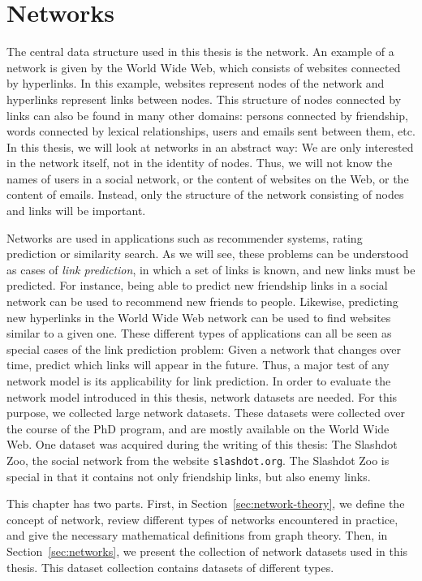 \documentclass[11pt,a4paper]{book}
\begin{document}
\chapter{Networks}
\label{chap:preliminaries}
The central data structure used in this thesis is the network.  An
example of a network is given by the World Wide Web, which consists of
websites connected by hyperlinks.  In this example, websites represent
nodes of the network and hyperlinks represent links between nodes.  This
structure of nodes connected by links can also be found in many other
domains:  persons connected by friendship, words connected by lexical
relationships, users and emails sent between them, etc.  In this thesis,
we will look at networks in an abstract way:  We are only interested in
the network itself, not in the identity of nodes.  Thus, we will not
know the names of users in a social network, or the content of websites
on the Web, or the content of emails.  Instead, only the structure of
the network consisting of nodes and links will be important.  


Networks are used in
applications such as recommender systems, rating prediction or
similarity search.  As we will see, these problems can be
understood as cases of \emph{link prediction}, in which a set of
links is known, and new links must be predicted.  For instance,
being able to predict new friendship links in a social network can be used
to recommend new friends to people.  Likewise, predicting new hyperlinks
in the World Wide Web network can be used to find websites similar to a
given one.  These different types of applications can all be seen as
special cases of the link prediction problem:  Given a network that
changes over time, predict which links will appear in the future. 
Thus, a major test of any network model is its applicability for link
prediction. 
In order to evaluate the network model introduced in this
thesis, network datasets 
are needed.  For this purpose, we collected large
network datasets.  These datasets were collected over the course
of the PhD program, and are mostly available on the World Wide
Web.  One dataset was acquired during the writing of this thesis:
The Slashdot Zoo, the social network from the website
\texttt{slashdot.org}.  The Slashdot Zoo is special in that it contains
not only friendship links, but also enemy links.  

This chapter has two parts.  First, in Section~\ref{sec:network-theory},
we define the concept of network, review different types of networks
encountered in practice, and give the necessary mathematical definitions
from graph theory.  Then, in Section~\ref{sec:networks}, we present the
collection of network datasets used in this thesis.  This dataset collection
contains datasets of different types.  
\end{document}
